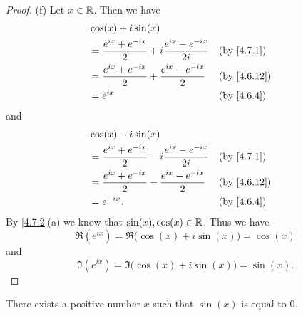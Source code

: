 \begin{proof}{(f)}
  Let \(x \in \mathbb{R}\).
  Then we have
  \begin{align*}
     & \cos(x) + i \sin(x)                                                                                 \\
     & = \dfrac{e^{i x} + e^{- i x}}{2} + i \dfrac{e^{i x} - e^{- i x}}{2i} &  & \text{(by \cref{4.7.1})}  \\
     & = \dfrac{e^{i x} + e^{- i x}}{2} + \dfrac{e^{i x} - e^{- i x}}{2}    &  & \text{(by \cref{4.6.12})} \\
     & = e^{i x}                                                            &  & \text{(by \cref{4.6.4})}
  \end{align*}
  and
  \begin{align*}
     & \cos(x) - i \sin(x)                                                                                 \\
     & = \dfrac{e^{i x} + e^{- i x}}{2} - i \dfrac{e^{i x} - e^{- i x}}{2i} &  & \text{(by \cref{4.7.1})}  \\
     & = \dfrac{e^{i x} + e^{- i x}}{2} - \dfrac{e^{i x} - e^{- i x}}{2}    &  & \text{(by \cref{4.6.12})} \\
     & = e^{- i x}.                                                         &  & \text{(by \cref{4.6.4})}
  \end{align*}
  By \cref{4.7.2}(a) we know that \(\sin(x), \cos(x) \in \mathbb{R}\).
  Thus we have
  \[
    \Re(e^{i x}) = \Re\big(\cos(x) + i \sin(x)\big) = \cos(x)
  \]
  and
  \[
    \Im(e^{i x}) = \Im\big(\cos(x) + i \sin(x)\big) = \sin(x).
  \]
\end{proof}

\begin{lem}\label{4.7.3}
  There exists a positive number \(x\) such that \(\sin(x)\) is equal to \(0\).
\end{lem}

